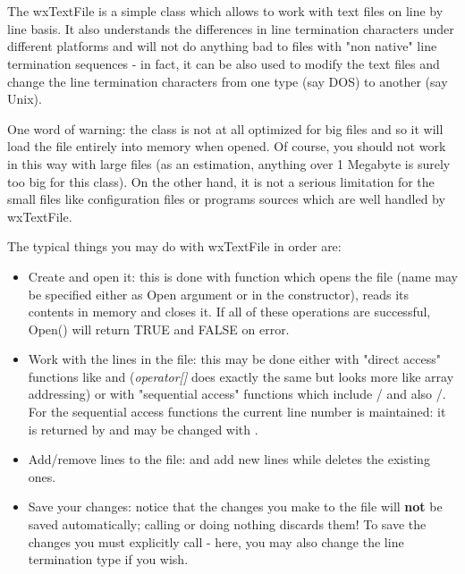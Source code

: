 \section{}\label{wxtextfile}

The wxTextFile is a simple class which allows to work with text files on line by
line basis. It also understands the differences in line termination characters
under different platforms and will not do anything bad to files with "non
native" line termination sequences - in fact, it can be also used to modify the
text files and change the line termination characters from one type (say DOS) to
another (say Unix).

One word of warning: the class is not at all optimized for big files and so it
will load the file entirely into memory when opened. Of course, you should not
work in this way with large files (as an estimation, anything over 1 Megabyte is
surely too big for this class). On the other hand, it is not a serious
limitation for the small files like configuration files or programs sources
which are well handled by wxTextFile.

The typical things you may do with wxTextFile in order are:

\begin{itemize}\itemsep=0pt
\item Create and open it: this is done with  
function which opens the file (name may be specified either as Open argument or
in the constructor), reads its contents in memory and closes it. If all of these
operations are successful, Open() will return TRUE and FALSE on error.
\item Work with the lines in the file: this may be done either with "direct
access" functions like  and 
 ({\it operator[]} does exactly the same
but looks more like array addressing) or with "sequential access" functions
which include /
 and also 
/.
For the sequential access functions the current line number is maintained: it is
returned by  and may be
changed with .
\item Add/remove lines to the file:  and 
 add new lines while 
 deletes the existing ones.
\item Save your changes: notice that the changes you make to the file will {\bf
not} be saved automatically; calling  or doing
nothing discards them! To save the changes you must explicitly call 
 - here, you may also change the line
termination type if you wish.
\end{itemize}

